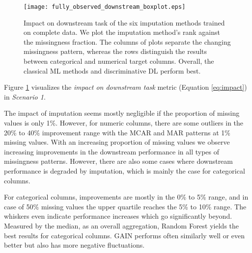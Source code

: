 

\begin{figure}\centering
	\texttt{[image: fully\_observed\_downstream\_boxplot.eps]}

	\caption[Downstream Ranks - Fully Observed]{Impact on downstream task of the six imputation methods trained on complete data. We plot the imputation method's rank against the missingness fraction. The columns of plots separate the changing missingness pattern, whereas the rows distinguish the results between categorical and numerical target columns. Overall, the classical ML methods and discriminative DL perform best.
    }
	\label{fig:fully_observed_downstream_boxplot}
\end{figure}

Figure \ref{fig:fully_observed_downstream_boxplot} visualizes the \textit{impact on downstream task} metric (Equation \ref{eq:impact}) in \textit{Scenario 1}. 

The impact of imputation seems mostly negligible if the proportion of missing values is only 1\%. However, for numeric columns, there are some outliers in the 20\% to 40\% improvement range with the MCAR and MAR patterns at 1\% missing values. With an increasing proportion of missing values we observe increasing improvements in the downstream performance in all types of missingness patterns. However, there are also some cases where downstream performance is degraded by imputation, which is mainly the case for categorical columns.

For categorical columns, improvements are mostly in the 0\% to 5\% range, and in case of 50\% missing values the upper quartile reaches the 5\% to 10\% range. The whiskers even indicate performance increases which go significantly beyond. Measured by the median, as an overall aggregation, Random Forest yields the best results for categorical columns. GAIN performs often similarly well or even better but also has more negative fluctuations.


